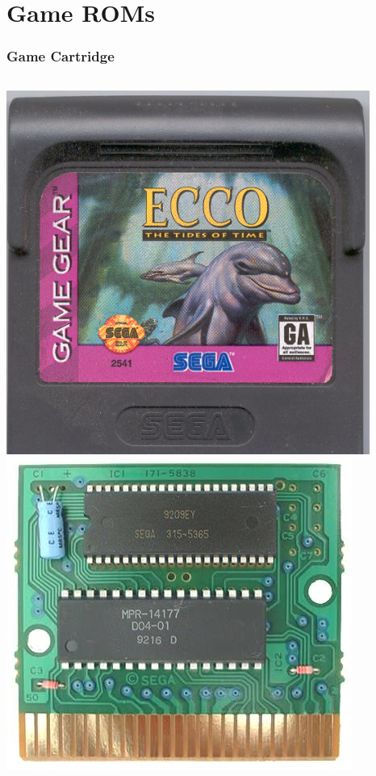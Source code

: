 \documentclass{beamer}
\begin{document}
\section{Game ROMs}
\begin{frame}
    \frametitle{Game Cartridge}

    \begin{columns}[c]
            \includegraphics[width=\textwidth]{../design/gg_cart.png}
            \includegraphics[width=\textwidth]{../design/gg_cart_pcb.png}
    \end{columns}
\end{frame}
\end{document}
